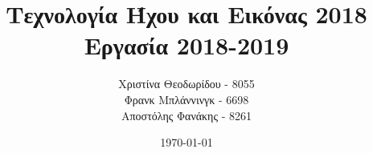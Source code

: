 \documentclass[11pt]{article}
\title{Τεχνολογία Ήχου και Εικόνας 2018\\
    Εργασία 2018-2019}
\author{Χριστίνα Θεοδωρίδου - 8055\\
    Φρανκ Μπλάννινγκ - 6698\\
    Αποστόλης Φανάκης - 8261}
\date{\today}
\begin{document}
  \maketitle
  \tableofcontents

  \newpage
  
  
  
  
  

  
  {}
\end{document}
